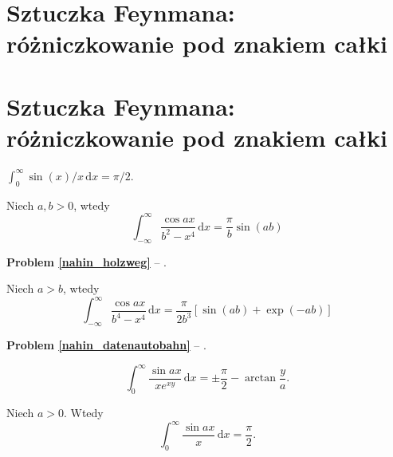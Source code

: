 %

\section{Sztuczka Feynmana: różniczkowanie pod znakiem całki}
\section{Sztuczka Feynmana: różniczkowanie pod znakiem całki} %

\begin{problem}
    $\int_0^\infty \sin(x) / x \,\mathrm{d}x = \pi/2$.
\end{problem}


\begin{problem}
    \label{nahin_holzweg}%
    Niech $a, b > 0$, wtedy
    \begin{equation}
        \int_{-\infty}^\infty \frac{\cos ax}{b^2 - x^4} \,\mathrm{d} x = \frac{\pi}{b} \sin (ab)
    \end{equation}
\end{problem}

\textbf{Problem \ref{nahin_holzweg}} -- \cite[s. 115, 375, 376]{nahin15}. %

\begin{problem}
    \label{nahin_datenautobahn}%
    Niech $a > b$, wtedy
    \begin{equation}
        \int_{-\infty}^\infty \frac{\cos ax}{b^4 - x^4} \,\mathrm{d} x = \frac{\pi}{2b^3} [\sin (ab) + \exp (-ab)]
    \end{equation}
\end{problem}

\textbf{Problem \ref{nahin_datenautobahn}} -- \cite[s. 115, 376]{nahin15}. %

\begin{problem}
    \begin{equation}
        \int_0^\infty \frac{\sin ax}{x e^{xy}} \,\mathrm{d}x = \pm \frac \pi 2 - \arctan \frac y a.
    \end{equation}
\end{problem}

\begin{problem}
    Niech $a > 0$.
    Wtedy
    \begin{equation}
        \int_0^\infty \frac{\sin ax}{x} \,\mathrm{d}x = \frac \pi 2.
    \end{equation}
\end{problem}

